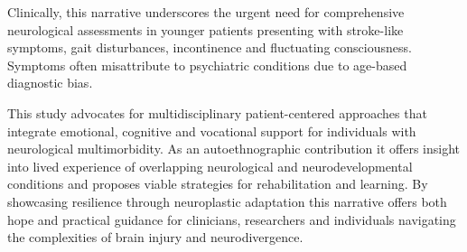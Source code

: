 \documentclass{article}
\begin{document}
Clinically, this narrative underscores the urgent need for comprehensive neurological assessments in younger patients presenting with stroke-like symptoms, gait disturbances, incontinence and fluctuating consciousness. Symptoms often misattribute to psychiatric conditions due to age-based diagnostic bias.

This study advocates for multidisciplinary patient-centered approaches that integrate emotional, cognitive and vocational support for individuals with neurological multimorbidity. As an autoethnographic contribution it offers insight into lived experience of overlapping neurological and neurodevelopmental conditions and proposes viable strategies for rehabilitation and learning. By showcasing resilience through neuroplastic adaptation this narrative offers both hope and practical guidance for clinicians, researchers and individuals navigating the complexities of brain injury and neurodivergence.



\end{document}
